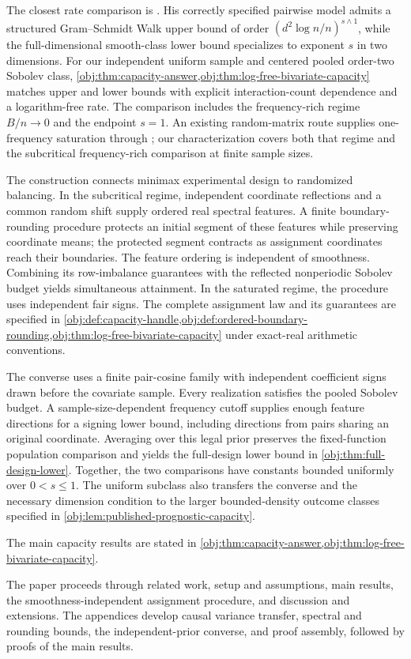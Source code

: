 The closest rate comparison is \citet[Theorem B.8(ii), Lemma B.9, and Theorem 4.9]{Cytrynbaum2026Limits}. His correctly specified pairwise model admits a structured Gram--Schmidt Walk upper bound of order \((d^2\log n/n)^{s\wedge1}\), while the full-dimensional smooth-class lower bound specializes to exponent \(s\) in two dimensions. For our independent uniform sample and centered pooled order-two Sobolev class, \cref{obj:thm:capacity-answer,obj:thm:log-free-bivariate-capacity} matches upper and lower bounds with explicit interaction-count dependence and a logarithm-free rate. The comparison includes the frequency-rich regime \(B/n\to0\) and the endpoint \(s=1\). An existing random-matrix route supplies one-frequency saturation through \citet[Theorem 1.2(2a)]{KoganNandyHuang2024Extremal}; our characterization covers both that regime and the subcritical frequency-rich comparison at finite sample sizes.

The construction connects minimax experimental design \citep[Sections 2.2--2.4]{Kallus2018} to randomized balancing. In the subcritical regime, independent coordinate reflections and a common random shift supply ordered real spectral features. A finite boundary-rounding procedure protects an initial segment of these features while preserving coordinate means; the protected segment contracts as assignment coordinates reach their boundaries. The feature ordering is independent of smoothness. Combining its row-imbalance guarantees with the reflected nonperiodic Sobolev budget yields simultaneous attainment. In the saturated regime, the procedure uses independent fair signs. The complete assignment law and its guarantees are specified in \cref{obj:def:capacity-handle,obj:def:ordered-boundary-rounding,obj:thm:log-free-bivariate-capacity} under exact-real arithmetic conventions.

The converse uses a finite pair-cosine family with independent coefficient signs drawn before the covariate sample. Every realization satisfies the pooled Sobolev budget. A sample-size-dependent frequency cutoff supplies enough feature directions for a signing lower bound, including directions from pairs sharing an original coordinate. Averaging over this legal prior preserves the fixed-function population comparison and yields the full-design lower bound in \cref{obj:thm:full-design-lower}. Together, the two comparisons have constants bounded uniformly over \(0<s\leq1\). The uniform subclass also transfers the converse and the necessary dimension condition to the larger bounded-density outcome classes specified in \cref{obj:lem:published-prognostic-capacity}.

The main capacity results are stated in \cref{obj:thm:capacity-answer,obj:thm:log-free-bivariate-capacity}.

The paper proceeds through related work, setup and assumptions, main results, the smoothness-independent assignment procedure, and discussion and extensions. The appendices develop causal variance transfer, spectral and rounding bounds, the independent-prior converse, and proof assembly, followed by proofs of the main results.

